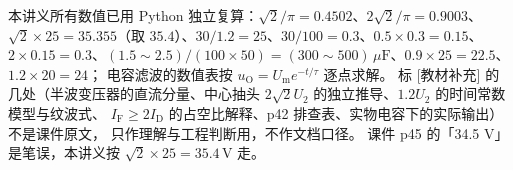 \documentclass[11pt]{ctexart}
\begin{document}
\flowerrule

{\small\color{inkgray}
本讲义所有数值已用 Python 独立复算：$\sqrt2/\pi=0.4502$、$2\sqrt2/\pi=0.9003$、
$\sqrt2\times25=35.355$（取 $35.4$）、$30/1.2=25$、$30/100=0.3$、$0.5\times0.3=0.15$、
$2\times0.15=0.3$、$(1.5\sim2.5)/(100\times50)=(300\sim500)\,\mu\mathrm{F}$、$0.9\times25=22.5$、$1.2\times20=24$；
电容滤波的数值表按 $u_{\mathrm{O}}=U_{\mathrm{m}}e^{-t/\tau}$ 逐点求解。
标 [教材补充] 的几处（半波变压器的直流分量、中心抽头 $2\sqrt2U_2$ 的独立推导、$1.2U_2$ 的时间常数模型与纹波式、
$I_{\mathrm{F}}\ge2I_{\mathrm{D}}$ 的占空比解释、p42 排查表、实物电容下的实际输出）不是课件原文，
只作理解与工程判断用，不作文档口径。
课件 p45 的「34.5 V」是笔误，本讲义按 $\sqrt2\times25=35.4\,\mathrm{V}$ 走。}
\end{document}
